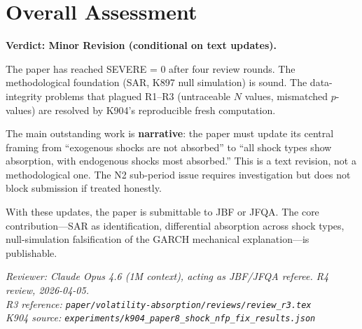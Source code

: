 \documentclass[12pt,a4paper]{article}
\begin{document}
\bigskip

\section*{Overall Assessment}

\textbf{Verdict: Minor Revision (conditional on text updates).}

The paper has reached SEVERE = 0 after four review rounds.
The methodological foundation (SAR, K897 null simulation) is sound.
The data-integrity problems that plagued R1--R3 (untraceable $N$ values, mismatched $p$-values) are resolved by K904's reproducible fresh computation.

The main outstanding work is \textbf{narrative}: the paper must update its central framing from ``exogenous shocks are not absorbed'' to ``all shock types show absorption, with endogenous shocks most absorbed.''
This is a text revision, not a methodological one.
The N2 sub-period issue requires investigation but does not block submission if treated honestly.

With these updates, the paper is submittable to JBF or JFQA.
The core contribution---SAR as identification, differential absorption across shock types, null-simulation falsification of the GARCH mechanical explanation---is publishable.

\bigskip

\noindent\textit{Reviewer: Claude Opus 4.6 (1M context), acting as JBF/JFQA referee. R4 review, 2026-04-05.}\\
\noindent\textit{R3 reference: \texttt{paper/volatility-absorption/reviews/review\_r3.tex}}\\
\noindent\textit{K904 source: \texttt{experiments/k904\_paper8\_shock\_nfp\_fix\_results.json}}
\end{document}
